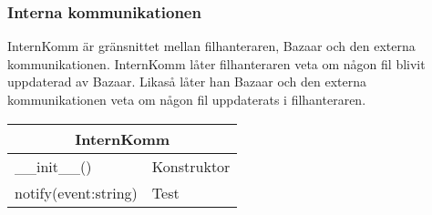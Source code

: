 \subsubsection{Interna kommunikationen}
InternKomm är gränsnittet mellan filhanteraren, Bazaar och den externa kommunikationen. InternKomm låter filhanteraren veta om någon fil blivit uppdaterad av Bazaar. Likaså låter han Bazaar och den externa kommunikationen veta om någon fil uppdaterats i filhanteraren.

\begin{tabular}{|l|l|}
\hline
\multicolumn{2}{|c|}{\textbf{InternKomm}} \\
\hline
\hline
\_\_init\_\_() &Konstruktor\\
notify(event:string) &Test\\
\hline

\end{tabular}

